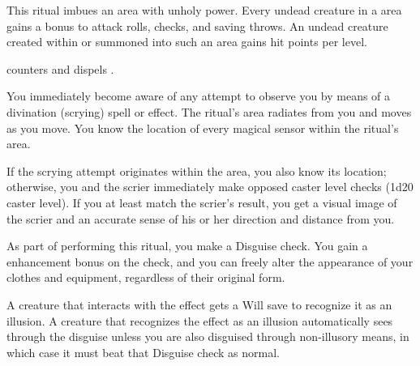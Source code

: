 \spellrng{\rngclose}
\begin{spelleffect}
This ritual imbues an area with unholy power. Every undead creature in a  area gains a  bonus to attack rolls, checks, and saving throws. An undead creature created within or summoned into such an area gains  hit points per level.
\end{spelleffect}
\begin{spellnotes}
 counters and dispels .
\end{spellnotes}

\spelldur{\durext}
\begin{spelleffect}
You immediately become aware of any attempt to observe you by means of a divination (scrying) spell or effect. The ritual's area radiates from you and moves as you move. You know the location of every magical sensor within the ritual's area.
\par If the scrying attempt originates within the area, you also know its location; otherwise, you and the scrier immediately make opposed caster level checks (1d20 \add caster level). If you at least match the scrier's result, you get a visual image of the scrier and an accurate sense of his or her direction and distance from you.
\end{spelleffect}

\spellrng{\rngpers}
\begin{spelleffect}
    As part of performing this ritual, you make a Disguise check. You gain a  enhancement bonus on the check, and you can freely alter the appearance of your clothes and equipment, regardless of their original form.
\end{spelleffect}
\begin{spellnotes}
  A creature that interacts with the effect gets a Will save to recognize it as an illusion. A creature that recognizes the effect as an illusion automatically sees through the disguise unless you are also disguised through non-illusory means, in which case it must beat that Disguise check as normal.
\end{spellnotes}

